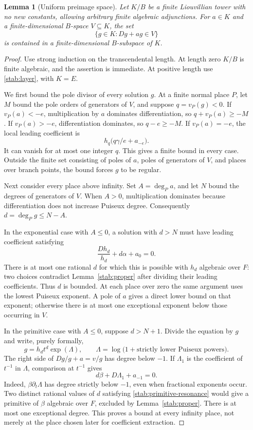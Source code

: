 \documentclass[11pt,a4paper]{article}
\newtheorem{lemma}[theorem]{Lemma}
\theoremstyle{definition}
\theoremstyle{remark}
\numberwithin{equation}{section}
\begin{document}
\begin{lemma}[Uniform preimage space]\label{stab:uniform}
Let $K/B$ be a finite Liouvillian tower with no new constants, allowing
arbitrary finite algebraic adjunctions.  For $a\in K$ and a
finite-dimensional $B$-space $V\subseteq K$, the set
\[
 \{g\in K: Dg+ag\in V\}
\]
is contained in a finite-dimensional $B$-subspace of $K$.
\end{lemma}
\begin{proof}
Use strong induction on the transcendental length.  At length zero
$K/B$ is finite algebraic, and the assertion is immediate.  At positive
length use \eqref{stab:layer}, with $K=E$.

We first bound the pole divisor of every solution $g$.  At a finite
normal place $P$, let $M$ bound the pole orders of generators of $V$,
and suppose $q=v_P(g)<0$.  If $v_P(a)<-e$, multiplication by $a$
dominates differentiation, so $q+v_P(a)\geq-M$.  If $v_P(a)>-e$,
differentiation dominates, so $q-e\geq-M$.  If $v_P(a)=-e$, the local
leading coefficient is
\[
 h_q\bigl(q\gamma/e+a_{-e}\bigr).
\]
It can vanish for at most one integer $q$.  This gives a finite bound
in every case.  Outside the finite set consisting of poles of $a$,
poles of generators of $V$, and places over branch points, the bound
forces $g$ to be regular.

Next consider every place above infinity.  Set $A=\deg_P a$, and let
$N$ bound the degrees of generators of $V$.  When $A>0$, multiplication
dominates because differentiation does not increase Puiseux degree.
Consequently $d=\deg_P g\leq N-A$.

In the exponential case with $A\leq0$, a solution with $d>N$ must
have leading coefficient satisfying
\[
 \frac{Dh_d}{h_d}+d\alpha+a_0=0.
\]
There is at most one rational $d$ for which this is possible with
$h_d$ algebraic over $F$: two choices contradict
Lemma~\ref{stab:proper} after dividing their leading coefficients.
Thus $d$ is bounded.  At each place over zero the same argument uses
the lowest Puiseux exponent.  A pole of $a$ gives a direct lower bound
on that exponent; otherwise there is at most one exceptional exponent
below those occurring in $V$.

In the primitive case with $A\leq0$, suppose $d>N+1$.  Divide the
equation by $g$ and write, purely formally,
\[
 g=h_dt^d\exp(\Lambda),\qquad
 \Lambda=\log\bigl(1+\text{strictly lower Puiseux powers}\bigr).
\]
The right side of $Dg/g+a=v/g$ has degree below $-1$.  If
$\Lambda_1$ is the coefficient of $t^{-1}$ in $\Lambda$, comparison
at $t^{-1}$ gives
\begin{equation}\label{stab:primitive-resonance}
 d\beta+D\Lambda_1+a_{-1}=0.
\end{equation}
Indeed, $\beta\partial_t\Lambda$ has degree strictly below $-1$,
even when fractional exponents occur.  Two distinct rational values
of $d$ satisfying \eqref{stab:primitive-resonance} would give a
primitive of $\beta$ algebraic over $F$, excluded by
Lemma~\ref{stab:proper}.  There is at most one exceptional degree.
This proves a bound at every infinity place, not merely at the place
chosen later for coefficient extraction.


\end{proof}
\end{document}
